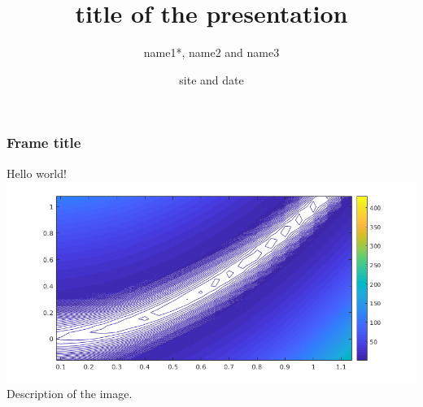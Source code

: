 \documentclass[aspectratio=169]{beamer}
\title{title of the presentation​​}
\author[name1, name2, name3]{name1*, name2 and name3}
\date[site]{site and date}
\begin{document}
\begin{frame}
 \titlepage 
\end{frame}

\begin{frame}
 \frametitle{Frame title }
 Hello world!\\
 \includegraphics[scale=0.5]{images/rosenbrockzoom.png}\\
 Description of the image.
\end{frame}

\end{document}
